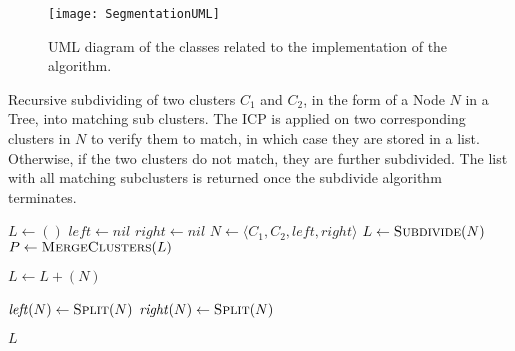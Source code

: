 
\begin{figure}
	\centering
	\texttt{[image: SegmentationUML]}
	\caption{UML diagram of the classes related to the implementation of the algorithm.}
	\label{fig:UML}
\end{figure}

\begin{algorithm}[tbp]
	\caption{Recursive subdividing of two clusters $C_1$ and $C_2$, in the form of a Node $\mathit{N}$ in a Tree, into matching sub clusters. The ICP is applied on two corresponding clusters in $\mathit{N}$ to verify them to match, in which case they are stored in a list. Otherwise, if the two clusters do not match, they are further subdivided. The list with all matching subclusters is returned once the subdivide algorithm terminates.}
	\label{alg:subdivide}
	
		\begin{algorithmic}[1]     %
			\label{clusterTree}
			
			\State $L \gets ()$
			\State $\mathit{left} \gets \mathit{nil}$
			\State $\mathit{right} \gets \mathit{nil}$
			\State $N \gets \langle C_1, C_2, \mathit{left}, \mathit{right}\rangle$
			\State $L \gets \Call{Subdivide}{N}$
			\State $P \gets \Call{MergeClusters}{L}$
			
			\EndProcedure
		\end{algorithmic}
	
	\begin{algorithmic}[1]     %
		\label{subdivide}
		
		\State $L \gets L + (N)$
		
		\Else
		\State $\mathit{left}(N) \gets \Call{Split}{N}$
		\State $\mathit{right}(N) \gets \Call{Split}{N}$
		\State {}
		\State {}
		\EndIf
		
		\State\Return $L$
		\EndProcedure
			
	\end{algorithmic}
\end{algorithm}

